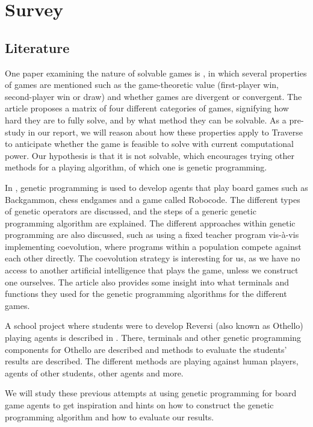 \documentclass[times, 10pt,twocolumn]{article}
\begin{document}
\section{Survey}

\subsection{Literature}
One paper examining the nature of solvable games is \cite{games_solved}, in which several properties of games are mentioned such as the game-theoretic value (first-player win, second-player win or draw) and whether games are divergent or convergent. The article proposes a matrix of four different categories of games, signifying how hard they are to fully solve, and by what method they can be solvable. As a pre-study in our report, we will reason about how these properties apply to Traverse to anticipate whether the game is feasible to solve with current computational power. Our hypothesis is that it is not solvable, which encourages trying other methods for a playing algorithm, of which one is genetic programming.

In \cite{human-competitive_gp}, genetic programming is used to develop agents that play board games such as Backgammon, chess endgames and a game called Robocode. The different types of genetic operators are discussed, and the steps of a generic genetic programming algorithm are explained. The different approaches within genetic programming are also discussed, such as using a fixed teacher program vis-à-vis implementing coevolution, where programs within a population compete against each other directly. The coevolution strategy is interesting for us, as we have no access to another artificial intelligence that plays the game, unless we construct one ourselves. The article also provides some insight into what terminals and functions they used for the genetic programming algorithms for the different games.

A school project where students were to develop Reversi (also known as Othello) playing agents is described in \cite{othello}. There, terminals and other genetic programming components for Othello are described and methods to evaluate the students' results are described. The different methods are playing against human players, agents of other students, other agents and more.

We will study these previous attempts at using genetic programming for board game agents to get inspiration and hints on how to construct the genetic programming algorithm and how to evaluate our results.
\end{document}

